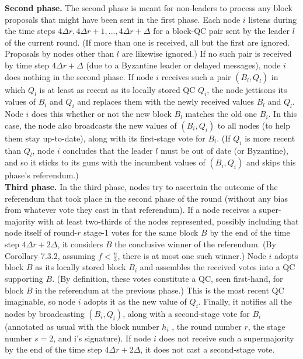 \noindent
\textbf{Second phase.} 
The second phase is meant for non-leaders to process any block proposals
that might have been sent in the first phase. Each node $i$ listens during the time steps
$4\Delta r, 4\Delta r + 1, . . . , 4\Delta r + \Delta$ for a block-QC pair sent by the leader $l$ of the current round.
(If more than one is received, all but the first are ignored. Proposals by nodes other than $l$
are likewise ignored.) If no such pair is received by time step $4\Delta r + \Delta$ (due to a Byzantine
leader or delayed messages), node $i$ does nothing in the second phase. If node $i$ receives such
a pair $(B_l, Q_l)$ in which $Q_l$ is at least as recent as its locally stored QC $Q_i$, the node jettisons its values of $B_i$ and $Q_i$ 
and replaces them with the newly received values $B_l$ and $Q_l$. Node $i$ does this whether or not the new block $B_l$ matches the old 
one $B_i$. In this case, the node
also broadcasts the new values of $(B_i, Q_i)$ to all nodes (to help them stay up-to-date), along
with its first-stage vote for $B_i$. (If $Q_i$ is more recent than $Q_l$, node $i$ concludes that the leader $l$ must be out of date 
(or Byzantine), and so it sticks to its guns with the incumbent values of $(B_i, Q_i)$ and skips this phase’s referendum.)\\

\noindent
\textbf{Third phase.} 
In the third phase, nodes try to ascertain the outcome of the referendum
that took place in the second phase of the round (without any bias from whatever vote they
cast in that referendum). If a node receives a super-majority with at least two-thirds of the nodes represented, possibly including that node itself of round-$r$ stage-1 votes for the same block $B$ by the end of the time step $4\Delta r + 2\Delta$, it considers $B$ the conclusive winner
of the referendum. (By Corollary 7.3.2, assuming $f < \frac{n}{3}$, there is at most one such winner.)
Node $i$ adopts block $B$ as its locally stored block $B_i$ and assembles the received votes into a
QC supporting $B$. (By definition, these votes constitute a QC, seen first-hand, for block $B$
in the referendum at the previous phase.) This is the most recent QC imaginable, so node $i$
adopts it as the new value of $Q_i$. Finally, it notifies all the nodes by broadcasting $(B_i, Q_i)$,
along with a second-stage vote for $B_i$ (annotated as usual with the block number $h_i$
, the round number $r$, the stage number $s = 2$, and i’s signature). If node $i$ does not receive such
a supermajority by the end of the time step $4\Delta r + 2\Delta$, it does not cast a second-stage vote.\\

